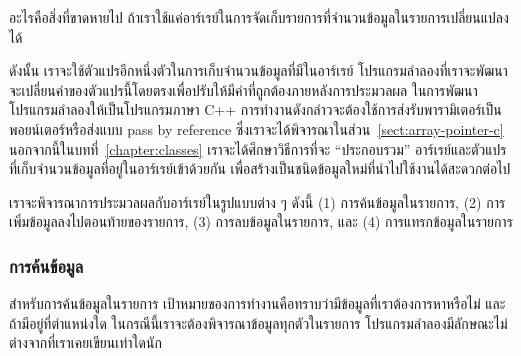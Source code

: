 \begin{quiz}{}
อะไร{\wbr}คือ{\wbr}สิ่ง{\wbr}ที่{\wbr}ขาด{\wbr}หาย{\wbr}ไป ถ้า{\wbr}เรา{\wbr}ใช้{\wbr}แค่{\wbr}อาร์เรย์{\wbr}ใน{\wbr}การ{\wbr}จัด{\wbr}เก็บ{\wbr}รายการ{\wbr}ที่{\wbr}จำนวน{\wbr}ข้อมูล{\wbr}ใน{\wbr}รายการ{\wbr}เปลี่ยนแปลง{\wbr}ได้{\wbr}
\end{quiz}

ดังนั้น เรา{\wbr}จะ{\wbr}ใช้{\wbr}ตัวแปร{\wbr}อีก{\wbr}หนึ่ง{\wbr}ตัว{\wbr}ใน{\wbr}การ{\wbr}เก็บ{\wbr}จำนวน{\wbr}ข้อมูล{\wbr}ที่{\wbr}มี{\wbr}ใน{\wbr}อาร์เรย์
โปรแกรม{\wbr}ลำ{\wbr}ลอง{\wbr}ที่{\wbr}เรา{\wbr}จะ{\wbr}พัฒนา{\wbr}จะ{\wbr}เปลี่ยน{\wbr}ค่า{\wbr}ของ{\wbr}ตัวแปร{\wbr}นี้{\wbr}โดย{\wbr}ตรง{\wbr}เพื่อ{\wbr}ปรับ{\wbr}ให้{\wbr}มี{\wbr}ค่า{\wbr}ที่{\wbr}ถูกต้อง{\wbr}ภายหลัง{\wbr}การ{\wbr}ประมวลผล{\wbr}
ใน{\wbr}การ{\wbr}พัฒนา{\wbr}โปรแกรม{\wbr}ลำ{\wbr}ลอง{\wbr}ให้{\wbr}เป็น{\wbr}โปรแกรม{\wbr}ภาษา C++
การ{\wbr}ทำงาน{\wbr}ดังกล่าว{\wbr}จะ{\wbr}ต้อง{\wbr}ใช้{\wbr}การ{\wbr}ส่ง{\wbr}รับ{\wbr}พารามิเตอร์{\wbr}เป็น{\wbr}พอยน์เตอร์{\wbr}หรือ{\wbr}ส่ง{\wbr}แบบ pass by
reference ซึ่ง{\wbr}เรา{\wbr}จะ{\wbr}ได้{\wbr}พิจารณา{\wbr}ใน{\wbr}ส่วน~\ref{sect:array-pointer-c}
นอกจากนี้{\wbr}ใน{\wbr}บท{\wbr}ที่~\ref{chapter:classes} เรา{\wbr}จะ{\wbr}ได้{\wbr}ศึกษา{\wbr}วิธีการ{\wbr}ที่{\wbr}จะ ``ประกอบ{\wbr}รวม''
อาร์เรย์และ{\wbr}ตัวแปร{\wbr}ที่{\wbr}เก็บ{\wbr}จำนวน{\wbr}ข้อมูล{\wbr}ที่อยู่{\wbr}ใน{\wbr}อาร์เรย์{\wbr}เข้า{\wbr}ด้วย{\wbr}กัน{\wbr}
เพื่อ{\wbr}สร้าง{\wbr}เป็น{\wbr}ชนิด{\wbr}ข้อมูล{\wbr}ใหม่{\wbr}ที่{\wbr}นำ{\wbr}ไป{\wbr}ใช้{\wbr}งาน{\wbr}ได้{\wbr}สะดวก{\wbr}ต่อไป{\wbr}

เรา{\wbr}จะ{\wbr}พิจารณา{\wbr}การ{\wbr}ประมวลผล{\wbr}กับ{\wbr}อาร์เรย์{\wbr}ใน{\wbr}รูปแบบ{\wbr}ต่าง ๆ ดังนี้ (1) การ{\wbr}ค้น{\wbr}ข้อมูล{\wbr}ใน{\wbr}รายการ, (2) การ{\wbr}เพิ่ม{\wbr}ข้อมูล{\wbr}ลง{\wbr}ไป{\wbr}ตอน{\wbr}ท้าย{\wbr}ของ{\wbr}รายการ, (3) การ{\wbr}ลบ{\wbr}ข้อมูล{\wbr}ใน{\wbr}รายการ, และ (4) การ{\wbr}แทรก{\wbr}ข้อมูล{\wbr}ใน{\wbr}รายการ{\wbr}

\subsubsection{การ{\wbr}ค้น{\wbr}ข้อมูล} 
สำหรับ{\wbr}การ{\wbr}ค้น{\wbr}ข้อมูล{\wbr}ใน{\wbr}รายการ{\wbr}
เป้าหมาย{\wbr}ของ{\wbr}การ{\wbr}ทำงาน{\wbr}คือ{\wbr}ทราบ{\wbr}ว่า{\wbr}มี{\wbr}ข้อมูล{\wbr}ที่{\wbr}เรา{\wbr}ต้องการ{\wbr}หา{\wbr}หรือ{\wbr}ไม่ และ{\wbr}ถ้า{\wbr}มี{\wbr}อยู่{\wbr}ที่{\wbr}ตำแหน่ง{\wbr}ใด{\wbr}
ใน{\wbr}กรณี{\wbr}นี้{\wbr}เรา{\wbr}จะ{\wbr}ต้อง{\wbr}พิจารณา{\wbr}ข้อมูล{\wbr}ทุก{\wbr}ตัว{\wbr}ใน{\wbr}รายการ{\wbr}
โปรแกรม{\wbr}ลำ{\wbr}ลอง{\wbr}มี{\wbr}ลักษณะ{\wbr}ไม่{\wbr}ต่าง{\wbr}จาก{\wbr}ที่{\wbr}เรา{\wbr}เคย{\wbr}เขียน{\wbr}เท่าใด{\wbr}นัก{\wbr}

